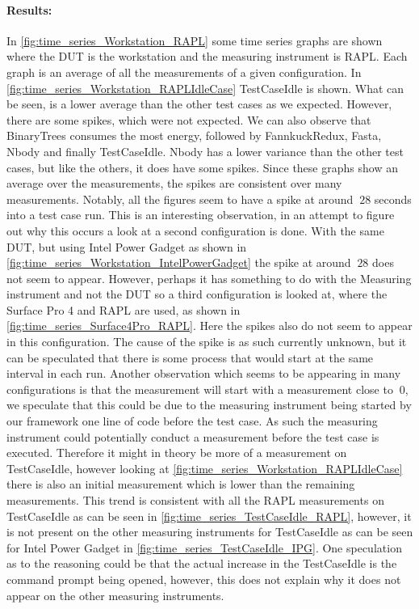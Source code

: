 \paragraph{Results:}
In \cref{fig:time_series_Workstation_RAPL} some time series graphs are shown where the DUT is the workstation and the measuring instrument is RAPL. Each graph is an average of all the measurements of a given configuration. In \cref{fig:time_series_Workstation_RAPLIdleCase} TestCaseIdle is shown. What can be seen, is a lower average than the other test cases as we expected. However, there are some spikes, which were not expected. We can also observe that BinaryTrees consumes the most energy, followed by FannkuckRedux, Fasta, Nbody and finally TestCaseIdle. Nbody has a lower variance than the other test cases, but like the others, it does have some spikes. Since these graphs show an average over the measurements, the spikes are consistent over many measurements. Notably, all the figures seem to have a spike at around $~28$ seconds into a test case run. This is an interesting observation, in an attempt to figure out why this occurs a look at a second configuration is done. With the same DUT, but using Intel Power Gadget as shown in \cref{fig:time_series_Workstation_IntelPowerGadget} the spike at around $~28$ does not seem to appear. However, perhaps it has something to do with the Measuring instrument and not the DUT so a third configuration is looked at, where the Surface Pro 4 and RAPL are used, as shown in \cref{fig:time_series_Surface4Pro_RAPL}. Here the spikes also do not seem to appear in this configuration. The cause of the spike is as such currently unknown, but it can be speculated that there is some process that would start at the same interval in each run. Another observation which seems to be appearing in many configurations is that the measurement will start with a measurement close to $~0$, we speculate that this could be due to the measuring instrument being started by our framework one line of code before the test case. As such the measuring instrument could potentially conduct a measurement before the test case is executed. Therefore it might in theory be more of a measurement on TestCaseIdle, however looking at \cref{fig:time_series_Workstation_RAPLIdleCase} there is also an initial measurement which is lower than the remaining measurements. This trend is consistent with all the RAPL measurements on TestCaseIdle as can be seen in \cref{fig:time_series_TestCaseIdle_RAPL}, however, it is not present on the other measuring instruments for TestCaseIdle as can be seen for Intel Power Gadget in \cref{fig:time_series_TestCaseIdle_IPG}. One speculation as to the reasoning could be that the actual increase in the TestCaseIdle is the command prompt being opened, however, this does not explain why it does not appear on the other measuring instruments. 


